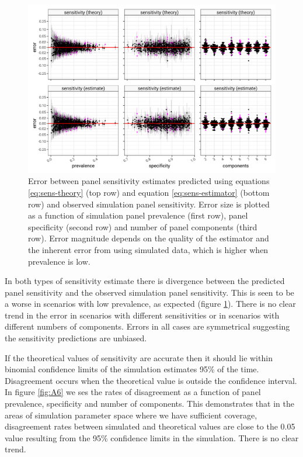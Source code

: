 \documentclass[a4paper, 12pt, twoside]{article}
\begin{document}
\begin{figure}[h!]
\centering
  \includegraphics{fig/error-prediction-v-simulation.png}
  \caption{Error between panel sensitivity estimates predicted using equations \eqref{eq:sens-theory} (top row) and equation \eqref{eq:sens-estimator} (bottom row) and observed simulation panel sensitivity. Error size is plotted as a function of simulation panel prevalence (first row), panel specificity (second row) and number of panel components (third row). Error magnitude depends on the quality of the estimator and the inherent error from using simulated data, which is higher when prevalence is low.}
\label{fig:A5}
\end{figure}

In both types of sensitivity estimate there is divergence between the predicted panel sensitivity and the observed simulation panel sensitivity. This is seen to be a worse in scenarios with low prevalence, as expected (figure \ref{fig:A5}). There is no clear trend in the error in scenarios with different sensitivities or in scenarios with different numbers of components. Errors in all cases are symmetrical suggesting the sensitivity predictions are unbiased.

If the theoretical values of sensitivity are accurate then it should lie within binomial confidence limits of the simulation estimates 95\% of the time. Disagreement occurs when the theoretical value is outside the confidence interval. In figure \ref{fig:A6} we ses the rates of disagreement as a function of panel prevalence, specificity and number of components. This demonstrates that in the areas of simulation parameter space where we have sufficient coverage, disagreement rates between simulated and theoretical values are close to the 0.05 value resulting from the 95\% confidence limits in the simulation. There is no clear trend.
\end{document}
